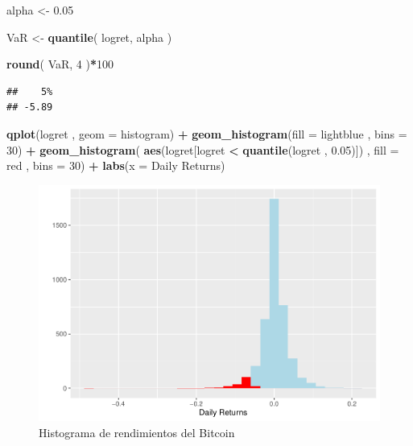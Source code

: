 \documentclass[
]{book}
\newenvironment{Shaded}{\begin{snugshade}}{\end{snugshade}}
\newcommand{\AttributeTok}[1]{\textcolor[rgb]{0.13,0.29,0.53}{#1}}
\newcommand{\DecValTok}[1]{\textcolor[rgb]{0.00,0.00,0.81}{#1}}
\newcommand{\FloatTok}[1]{\textcolor[rgb]{0.00,0.00,0.81}{#1}}
\newcommand{\FunctionTok}[1]{\textcolor[rgb]{0.13,0.29,0.53}{\textbf{#1}}}
\newcommand{\NormalTok}[1]{#1}
\newcommand{\OtherTok}[1]{\textcolor[rgb]{0.56,0.35,0.01}{#1}}
\newcommand{\SpecialCharTok}[1]{\textcolor[rgb]{0.81,0.36,0.00}{\textbf{#1}}}
\newcommand{\StringTok}[1]{\textcolor[rgb]{0.31,0.60,0.02}{#1}}
\begin{document}
\begin{Shaded}
\begin{Highlighting}[]
\NormalTok{alpha }\OtherTok{\textless{}{-}} \FloatTok{0.05}

\NormalTok{VaR }\OtherTok{\textless{}{-}} \FunctionTok{quantile}\NormalTok{( logret, alpha )}

\FunctionTok{round}\NormalTok{( VaR, }\DecValTok{4}\NormalTok{ )}\SpecialCharTok{*}\DecValTok{100}
\end{Highlighting}
\end{Shaded}

\begin{verbatim}
##    5% 
## -5.89
\end{verbatim}

\begin{Shaded}
\begin{Highlighting}[]
\FunctionTok{qplot}\NormalTok{(logret , }\AttributeTok{geom =} \StringTok{\textquotesingle{}histogram\textquotesingle{}}\NormalTok{) }\SpecialCharTok{+} 
  \FunctionTok{geom\_histogram}\NormalTok{(}\AttributeTok{fill =} \StringTok{\textquotesingle{}lightblue\textquotesingle{}}\NormalTok{ , }\AttributeTok{bins =} \DecValTok{30}\NormalTok{) }\SpecialCharTok{+}
  \FunctionTok{geom\_histogram}\NormalTok{( }\FunctionTok{aes}\NormalTok{(logret[logret }\SpecialCharTok{\textless{}} \FunctionTok{quantile}\NormalTok{(logret , }\FloatTok{0.05}\NormalTok{)]) , }
                  \AttributeTok{fill =} \StringTok{\textquotesingle{}red\textquotesingle{}}\NormalTok{ , }\AttributeTok{bins =} \DecValTok{30}\NormalTok{) }\SpecialCharTok{+}
  \FunctionTok{labs}\NormalTok{(}\AttributeTok{x =} \StringTok{\textquotesingle{}Daily Returns\textquotesingle{}}\NormalTok{)}
\end{Highlighting}
\end{Shaded}

\begin{figure}

{\centering \includegraphics{Notas-Series-Tiempo_files/figure-latex/fig103-1} 

}

\caption{Histograma de rendimientos del Bitcoin}\label{fig:fig103}
\end{figure}
\end{document}
